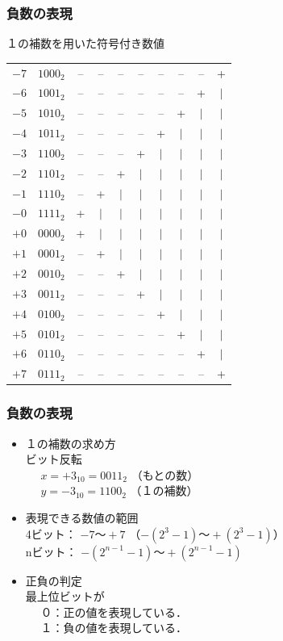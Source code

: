 \documentclass[handout]{beamer}        %
\begin{document}
\newcommand{\h}{$\vert$}
\begin{frame}
  \frametitle{負数の表現}
  \begin{itembox}[l]{１の補数を用いた符号付き数値}
    \small\begin{tabular}{ r r c c c c c c c c }
      $-7$  & $1000_2$ &--&--&--&--&--&--&--& +\\
      $-6$  & $1001_2$ &--&--&--&--&--&--&+ &\h\\
      $-5$  & $1010_2$ &--&--&--&--&--&+ &\h&\h\\
      $-4$  & $1011_2$ &--&--&--&--&+ &\h&\h&\h\\
      $-3$  & $1100_2$ &--&--&--&+ &\h&\h&\h&\h\\
      $-2$  & $1101_2$ &--&--&+ &\h&\h&\h&\h&\h\\
      $-1$  & $1110_2$ &--&+ &\h&\h&\h&\h&\h&\h\\
      $-0$  & $1111_2$ &+ &\h&\h&\h&\h&\h&\h&\h\\
      $+0$  & $0000_2$ &+ &\h&\h&\h&\h&\h&\h&\h\\
      $+1$  & $0001_2$ &--&+ &\h&\h&\h&\h&\h&\h\\
      $+2$  & $0010_2$ &--&--&+ &\h&\h&\h&\h&\h\\
      $+3$  & $0011_2$ &--&--&--&+ &\h&\h&\h&\h\\
      $+4$  & $0100_2$ &--&--&--&--&+ &\h&\h&\h\\
      $+5$  & $0101_2$ &--&--&--&--&--&+ &\h&\h\\
      $+6$  & $0110_2$ &--&--&--&--&--&--&+ &\h\\
      $+7$  & $0111_2$ &--&--&--&--&--&--&--& +\\
    \end{tabular}
  \end{itembox}
\end{frame}

\begin{frame}
  \frametitle{負数の表現}
  \begin{itemize}
  \item １の補数の求め方 \\
    ビット反転\\
    ~~ $x = +3_{10} = 0011_2$ （もとの数）\\
    ~~ $y = -3_{10} = 1100_2$ （１の補数）\\
    \vfill
  \item 表現できる数値の範囲 \\
    4ビット： $-7 〜 +7$ （$-(2^3-1)〜+(2^3-1)$） \\
    nビット： $-(2^{n-1} - 1) 〜 +(2^{n-1} - 1)$
    \vfill
  \item 正負の判定 \\
    最上位ビットが \\
    ~~ ０：正の値を表現している．\\
    ~~ １：負の値を表現している．
  \end{itemize}
\end{frame}
\end{document}
